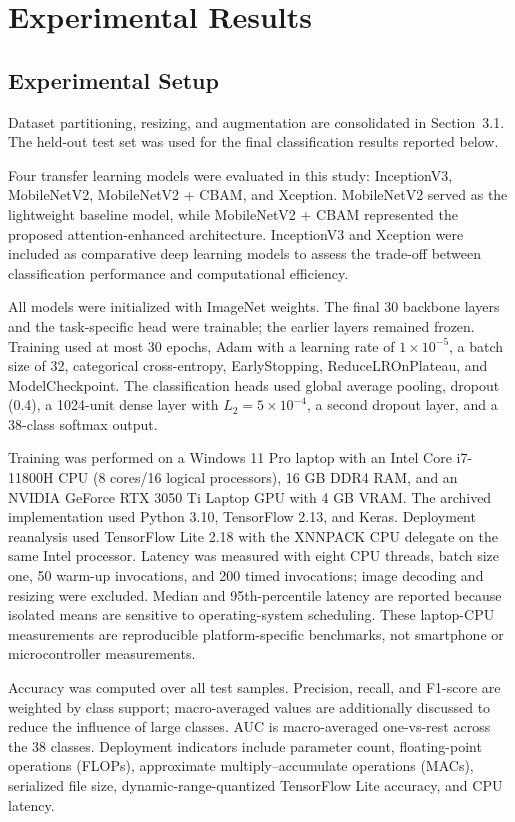 \section{Experimental Results}

\subsection{Experimental Setup}

Dataset partitioning, resizing, and augmentation are consolidated in Section~3.1. The held-out test set was used for the final classification results reported below.

Four transfer learning models were evaluated in this study: InceptionV3, MobileNetV2, MobileNetV2 + CBAM, and Xception. MobileNetV2 served as the lightweight baseline model, while MobileNetV2 + CBAM represented the proposed attention-enhanced architecture. InceptionV3 and Xception were included as comparative deep learning models to assess the trade-off between classification performance and computational efficiency.

All models were initialized with ImageNet weights. The final 30 backbone layers and the task-specific head were trainable; the earlier layers remained frozen. Training used at most 30 epochs, Adam with a learning rate of $1 \times 10^{-5}$, a batch size of 32, categorical cross-entropy, EarlyStopping, ReduceLROnPlateau, and ModelCheckpoint. The classification heads used global average pooling, dropout (0.4), a 1024-unit dense layer with $L_2=5\times10^{-4}$, a second dropout layer, and a 38-class softmax output.

Training was performed on a Windows 11 Pro laptop with an Intel Core i7-11800H CPU (8 cores/16 logical processors), 16 GB DDR4 RAM, and an NVIDIA GeForce RTX 3050 Ti Laptop GPU with 4 GB VRAM. The archived implementation used Python 3.10, TensorFlow 2.13, and Keras. Deployment reanalysis used TensorFlow Lite 2.18 with the XNNPACK CPU delegate on the same Intel processor. Latency was measured with eight CPU threads, batch size one, 50 warm-up invocations, and 200 timed invocations; image decoding and resizing were excluded. Median and 95th-percentile latency are reported because isolated means are sensitive to operating-system scheduling. These laptop-CPU measurements are reproducible platform-specific benchmarks, not smartphone or microcontroller measurements.

Accuracy was computed over all test samples. Precision, recall, and F1-score are weighted by class support; macro-averaged values are additionally discussed to reduce the influence of large classes. AUC is macro-averaged one-vs-rest across the 38 classes. Deployment indicators include parameter count, floating-point operations (FLOPs), approximate multiply--accumulate operations (MACs), serialized file size, dynamic-range-quantized TensorFlow Lite accuracy, and CPU latency.

